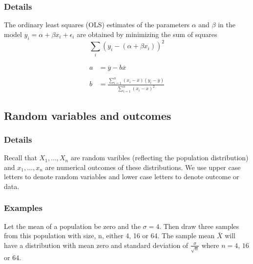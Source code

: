 \documentclass[12pt,a4paper]{article}
\theoremstyle{regla}
\theoremstyle{remark}
\theoremstyle{definition}
\theoremstyle{nonumberbreak}
\begin{document}
\subsubsection{Details}
The ordinary least squares (OLS) estimates of the parameters $\alpha$ and $\beta$ in the model $y_i=\alpha + \beta x_i + \epsilon_i$ are 
obtained by minimizing the sum of squares
$$
\sum_i \left ( y_i -(\alpha +\beta x_i)  \right )^2
$$

\begin{align*}
a&=\overline{y} - b\overline{x} \\
\\
b&= \frac{\displaystyle\sum^n_{i=1} (x_i-\overline{x})(y_i-\overline{y})}{\displaystyle\sum^n_{i=1} (x_i-\overline{x})^2}
\end{align*}


\subsection{Random variables and outcomes}
\subsubsection{Details}
Recall that $X_1, \ldots, X_n$ are random varibles (reflecting the population distribution) and $x_1, \ldots, x_n$ are numerical outcomes of these distributions. We use upper case letters to denote random variables and lower case letters to denote outcome or data.
\subsubsection{Examples}
\begin{xmpl}

Let the mean of a population be zero and the $\sigma=4$. Then draw three samples from this population with size, n, either 4, 16 or 64. The sample mean $\bar{X}$ will have a distribution with mean zero and standard deviation of $\frac{\sigma}{\sqrt{n}}$ where $n= 4$, $16$ or $64$.
\end{xmpl}

\end{document}
